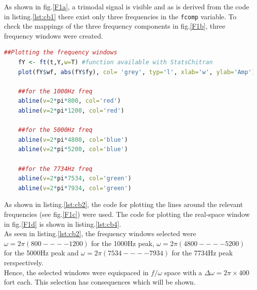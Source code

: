 \documentclass{article}
\begin{document}
As shown in fig.\ref{F1a}, a trimodal signal is visible and as is derived from the code in listing.\ref{lst:cb1} there exist only three frequencies in the  \lstinline[language=R]|fcomp| variable.
To check the mappings of the three frequency components in fig.\ref{F1b}, three frequency windows were created.
\pagebreak
 \begin{lstlisting}[language=R, label={lst:cb2}, caption={code for plotting the three frequency windows in fig.\ref{F1c}}, captionpos=b]
	##Plotting the frequency windows
	fY <- ft(t,Y,w=T) #function available with StatsChitran
	plot(fY$wf, abs(fY$fy), col= 'grey', typ='l', xlab='w', ylab='Amp')
	
	##for the 1000Hz freq
	abline(v=2*pi*800, col='red')
	abline(v=2*pi*1200, col='red')
	
	##for the 5000Hz freq
	abline(v=2*pi*4800, col='blue')
	abline(v=2*pi*5200, col='blue')
	
	##for the 7734Hz freq
	abline(v=2*pi*7534, col='green')
	abline(v=2*pi*7934, col='green')
\end{lstlisting}
As shown in listing.\ref{lst:cb2}, the code for plotting the lines around the relevant frequencies (see fig.\ref{F1c}) were used. The code for plotting the real-space window in fig.\ref{F1d} is shown in listing.\ref{lst:cb4}.\\
 As seen in listing.\ref{lst:cb2}, the frequency windows selected were $\omega = 2\pi(800 ---- 1200)$ for the 1000\si{Hz} peak, $\omega = 2\pi(4800 ---- 5200)$ for the 5000\si{Hz} peak and $\omega = 2\pi(7534 ---- 7934)$ for the 7734\si{Hz} peak rerspectively.\\
 Hence, the selected windows were equispaced in $f/\omega$ space with a $\Delta\omega = 2\pi \times 400$ fort each. This selection has consequences which will be shown.
\end{document}

